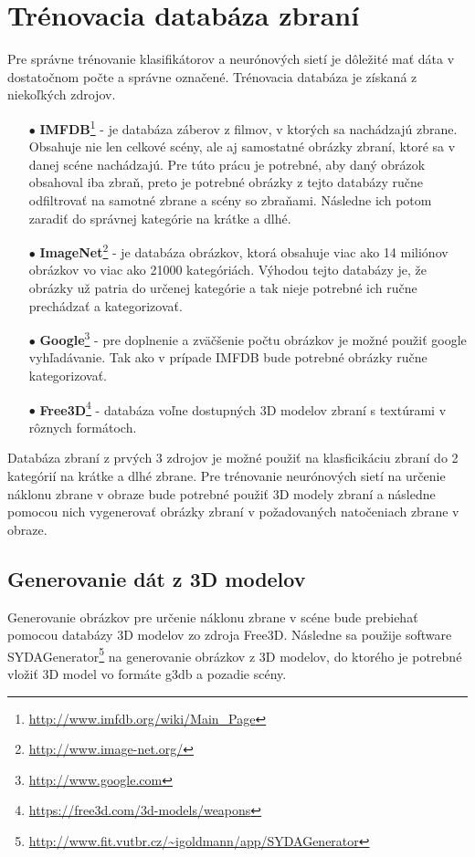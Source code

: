 
\section{Trénovacia databáza zbraní}
\label{sec:databaza}
Pre správne trénovanie klasifikátorov a neurónových sietí je dôležité mať dáta v dostatočnom počte a správne označené.
Trénovacia databáza je získaná z niekoľkých zdrojov.
\begin{enumerate}
    \item[$\bullet$] \textbf{IMFDB}\footnote{\url{http://www.imfdb.org/wiki/Main_Page}} - je databáza záberov z filmov, v ktorých sa nachádzajú zbrane.
    Obsahuje nie len celkové scény, ale aj samostatné obrázky zbraní, ktoré sa v danej scéne nachádzajú.
    Pre túto prácu je potrebné, aby daný obrázok obsahoval iba zbraň, preto je potrebné obrázky z tejto databázy ručne odfiltrovať na samotné zbrane a scény so zbraňami.
    Následne ich potom zaradiť do správnej kategórie na krátke a dlhé.
    \item[$\bullet$] \textbf{ImageNet}\footnote{\url{http://www.image-net.org/}} - je databáza obrázkov, ktorá obsahuje viac ako 14 miliónov obrázkov vo viac ako 21000 kategóriách.
    Výhodou tejto databázy je, že obrázky už patria do určenej kategórie a tak nieje potrebné ich ručne prechádzať a kategorizovať.
    \item[$\bullet$] \textbf{Google}\footnote{\url{http://www.google.com}} - pre doplnenie a zväčšenie počtu obrázkov je možné použiť google vyhľadávanie.
    Tak ako v prípade IMFDB bude potrebné obrázky ručne kategorizovať.
    \item[$\bullet$] \textbf{Free3D}\footnote{\url{https://free3d.com/3d-models/weapons}} - databáza voľne dostupných 3D modelov zbraní s textúrami v rôznych formátoch.
\end{enumerate}

Databáza zbraní z prvých 3 zdrojov je možné použiť na klasficikáciu zbraní do 2 kategórií na krátke a dlhé zbrane.
Pre trénovanie neurónových sietí na určenie náklonu zbrane v obraze bude potrebné použiť 3D modely zbraní a následne pomocou nich vygenerovať
    obrázky zbraní v požadovaných natočeniach zbrane v obraze.

\subsection{Generovanie dát z 3D modelov}
\label{subsec:generovanie3d}
Generovanie obrázkov pre určenie náklonu zbrane v scéne bude prebiehať pomocou databázy 3D modelov zo zdroja Free3D.
Následne sa použije software SYDAGenerator\footnote{\url{http://www.fit.vutbr.cz/~igoldmann/app/SYDAGenerator}} na generovanie obrázkov z 3D modelov,
    do ktorého je potrebné vložiť 3D model vo formáte g3db a pozadie scény.

